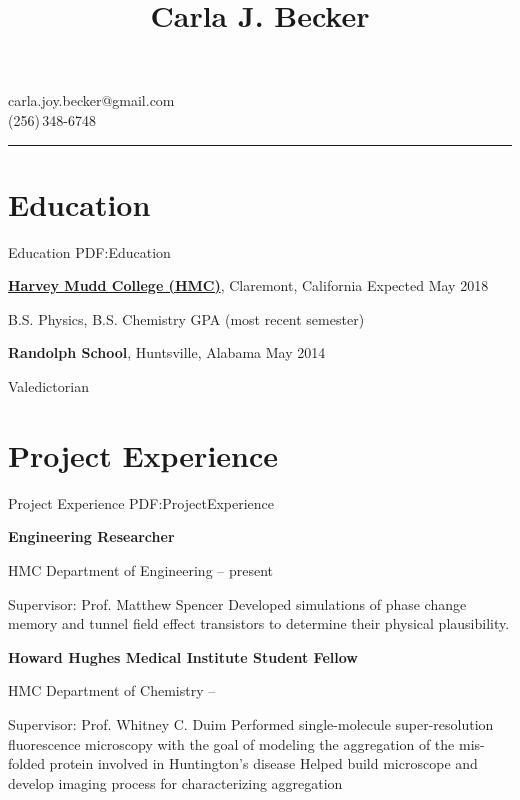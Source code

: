 \documentclass[letterpaper,10pt,oneside]{article}
\newcommand{\CVAuthor}{Carla J. Becker}
\begin{document}

\title{\CVAuthor}

\begin{subtitle}
carla.joy.becker@gmail.com
\\
(256)\,348-6748 
\end{subtitle}
\vspace{2mm}
\hrule
\begin{body}


\section
{Education}
{Education}
{PDF:Education}

\href{https://www.hmc.edu/}
{\textbf{Harvey Mudd College (HMC)}},
Claremont, California
\hfill
Expected May 2018

\GapNoBreak
\BulletItem
B.S. Physics, B.S. Chemistry 
 GPA (most recent semester)

\Gap
{\textbf{Randolph School}},
Huntsville, Alabama
\hfill
May 2014

\GapNoBreak
\BulletItem
Valedictorian


\section
{Project Experience}
{Project Experience}
{PDF:ProjectExperience}

{\textbf{Engineering Researcher}}

\GapNoBreak
\BulletItem
HMC Department of Engineering
\hfill
{} --
present
\begin{detail}
\SubBulletItem
Supervisor:
Prof. Matthew Spencer
\SubBulletItemBullet
Developed simulations of phase change memory and tunnel field effect transistors to determine their physical plausibility.
\end{detail}

\BigGap

{\textbf{Howard Hughes Medical Institute Student Fellow}}

\GapNoBreak
\BulletItem
HMC Department of Chemistry
\hfill
{} --
\begin{detail}
\SubBulletItem
Supervisor:
Prof. Whitney C. Duim
\SubBulletItemBullet
Performed single-molecule super-resolution fluorescence microscopy with the goal of modeling the aggregation of the mis-folded protein involved in	Huntington's disease
\SubBulletItemBullet
Helped build microscope and develop imaging process for 			characterizing aggregation
\end{detail}


\end{body}
\end{document}
